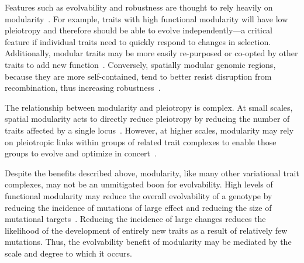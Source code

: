 \documentclass[PhD]{msu-thesis}
\begin{document}
Features such as evolvability and robustness are thought to rely heavily on modularity~\cite{gunter_p._wagner_perspective:_1996}. For example, traits with high functional modularity will have low pleiotropy and therefore should be able to evolve independently---a critical feature if individual traits need to quickly respond to changes in selection. Additionally, modular traits may be more easily re-purposed or co-opted by other traits to add new function~\cite{ravasz_hierarchical_2002}.
Conversely, spatially modular genomic regions, because they are more self-contained, tend to better resist disruption from recombination, thus increasing robustness~\cite{misevic_sexual_2006}. 

The relationship between modularity and pleiotropy is complex. At small scales, spatial modularity acts to directly reduce pleiotropy by reducing the number of traits affected by a single locus~\cite{misevic_sexual_2006}. However, at higher scales, modularity may rely on pleiotropic links within groups of related trait complexes to enable those groups to evolve and optimize in concert~\cite{gunter_p._wagner_pleiotropic_2011}. 

Despite the benefits described above, modularity, like many other variational trait complexes, may not be an unmitigated boon for evolvability. High levels of functional modularity may reduce the overall evolvability of a genotype by reducing the incidence of mutations of large effect and reducing the size of mutational targets~\cite{hansen_is_2003}. Reducing the incidence of large changes reduces the likelihood of the development of entirely new traits as a result of relatively few mutations. Thus, the evolvability benefit of modularity may be mediated by the scale and degree to which it occurs.
\end{document}

